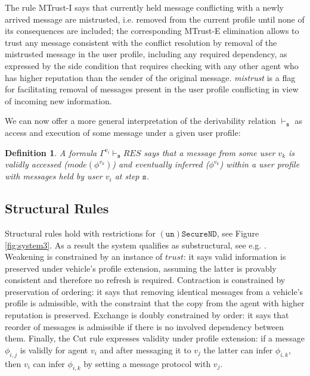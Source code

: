 \documentclass[compsoc, conference, letterpaper, 10pt, times]{IEEEtran}
\newtheorem{definition}{Definition}
\begin{document}
The rule MTrust-I says that currently held message conflicting with a newly arrived message are mistrusted, i.e. removed from the current profile until none of its consequences are included; the corresponding MTrust-E elimination allows to trust any message consistent with the conflict resolution by removal of the mistrusted message in the user profile, including any required dependency, as expressed by the side condition that requires checking with any other agent who has higher reputation than the sender of the original message. 
\textit{mistrust} is a flag for facilitating removal of messages present in the user profile conflicting in view of incoming new information. 



We can now offer a more general interpretation of the derivability relation $\vdash_{\mathtt{s}} $ as access and execution of some message under a given user profile:
%
\begin{definition}
	A formula $\Gamma^{v_{i}} \vdash_{\mathtt{s}}  RES$ says that a message from some user $v_{k}$ is validly accessed ($mode(\phi^{v_{k}})$) and eventually inferred ($\phi^{v_{k}}$) within a user profile with messages held by user $v_{i}$ at step $\mathtt{s}$. 
\end{definition}



\subsection{Structural Rules}

Structural rules hold with restrictions for $\mathtt{(un)SecureND}$, see Figure \ref{fig:system3}. As a result the system qualifies as substructural, see e.g. \cite{restall}. Weakening is constrained by an instance of $trust$: it says valid information is preserved under vehicle's profile extension, assuming the latter is provably consistent and therefore no refresh is required. Contraction is constrained by preservation of ordering: it says that removing identical messages from  a vehicle's profile is admissible, with the constraint that the copy from the agent with higher reputation is preserved. Exchange is doubly constrained by order: it says that reorder of messages is admissible if there is no involved dependency between them. Finally, the Cut rule expresses validity under profile extension: if a message $\phi_{i,j}$ is validly for agent $v_{i}$ and after messaging it to $v_{j}$ the latter can infer $\phi_{i,k}$, then $v_{i}$ can infer $\phi_{i,k}$ by setting a message protocol with $v_{j}$.
\end{document}
